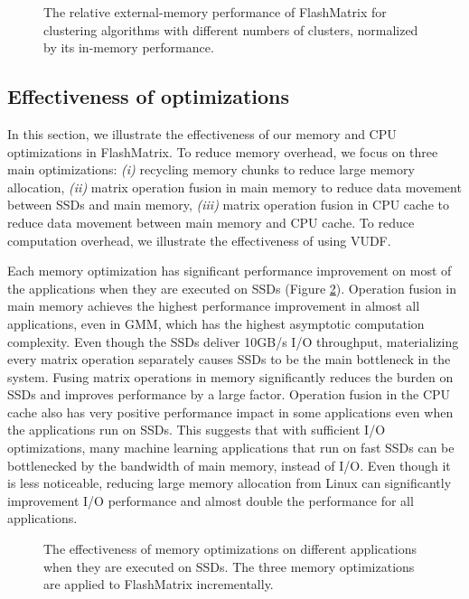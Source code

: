 \begin{figure}
	\begin{center}
		\footnotesize
		\vspace{-15pt}
		
		\vspace{-10pt}
		\caption{The relative external-memory performance of FlashMatrix for
			clustering algorithms with different numbers of clusters, normalized
		by its in-memory performance.}
		\label{perf:clust}
	\end{center}
\end{figure}

\subsection{Effectiveness of optimizations}

In this section, we illustrate the effectiveness of our memory and CPU
optimizations in FlashMatrix. To reduce memory overhead, we focus on three
main optimizations: \textit{(i)} recycling memory chunks to reduce large
memory allocation, \textit{(ii)} matrix operation fusion in main
memory to reduce data movement between SSDs and main memory, \textit{(iii)}
matrix operation fusion in CPU cache to reduce data movement between main
memory and CPU cache. To reduce computation overhead, we illustrate
the effectiveness of using VUDF.

Each memory optimization has significant performance improvement on most of
the applications when they are executed on SSDs (Figure \ref{perf:opts}).
Operation fusion in main memory achieves
the highest performance improvement in almost all applications, even in GMM,
which has the highest asymptotic computation complexity. Even though the SSDs
deliver 10GB/s I/O throughput, materializing every matrix operation separately
causes SSDs to be the main bottleneck in the system.
Fusing matrix operations in memory significantly reduces the burden on SSDs and
improves performance by a large factor. Operation fusion in the CPU cache also
has very positive performance impact in some applications even when
the applications run on SSDs. This suggests that with sufficient I/O optimizations,
many machine learning applications that run on fast SSDs can be bottlenecked by
the bandwidth of main memory, instead of I/O. Even though it is less noticeable,
reducing large memory allocation from Linux can significantly improvement I/O
performance and almost double the performance for all applications.

\begin{figure}
	\begin{center}
		\footnotesize
		\vspace{-15pt}
		
		\vspace{-10pt}
		\caption{The effectiveness of memory optimizations on different
			applications when they are executed on SSDs. The three memory
		optimizations are applied to FlashMatrix incrementally.}
		\label{perf:opts}
	\end{center}
\end{figure}
